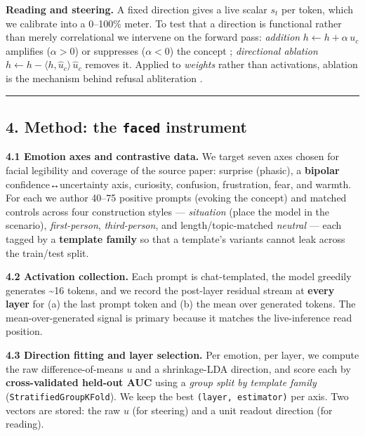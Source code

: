 \documentclass[
]{article}
\begin{document}
\textbf{Reading and steering.} A fixed direction gives a live scalar
\(s_t\) per token, which we calibrate into a 0--100\% meter. To test
that a direction is functional rather than merely correlational we
intervene on the forward pass: \emph{addition}
\(h \leftarrow h + \alpha\,u_c\) amplifies (\(\alpha>0\)) or suppresses
(\(\alpha<0\)) the concept \citep{turner2023actadd, rimsky2024caa};
\emph{directional ablation}
\(h \leftarrow h - \langle h,\hat u_c\rangle\,\hat u_c\) removes it.
Applied to \emph{weights} rather than activations, ablation is the
mechanism behind refusal abliteration \citep{arditi2024refusal}.

\begin{center}\rule{0.5\linewidth}{0.5pt}\end{center}

\subsection{\texorpdfstring{4. Method: the \texttt{faced}
instrument}{4. Method: the faced instrument}}\label{method-the-faced-instrument}

\textbf{4.1 Emotion axes and contrastive data.} We target seven axes
chosen for facial legibility and coverage of the source paper: surprise
(phasic), a \textbf{bipolar} confidence↔uncertainty axis, curiosity,
confusion, frustration, fear, and warmth. For each we author 40--75
positive prompts (evoking the concept) and matched controls across four
construction styles --- \emph{situation} (place the model in the
scenario), \emph{first-person}, \emph{third-person}, and
length/topic-matched \emph{neutral} --- each tagged by a
\textbf{template family} so that a template's variants cannot leak
across the train/test split.

\textbf{4.2 Activation collection.} Each prompt is chat-templated, the
model greedily generates \textasciitilde16 tokens, and we record the
post-layer residual stream at \textbf{every layer} for (a) the last
prompt token and (b) the mean over generated tokens. The
mean-over-generated signal is primary because it matches the
live-inference read position.

\textbf{4.3 Direction fitting and layer selection.} Per emotion, per
layer, we compute the raw difference-of-means \(u\) and a shrinkage-LDA
direction, and score each by \textbf{cross-validated held-out AUC} using
a \emph{group split by template family} (\texttt{StratifiedGroupKFold}).
We keep the best \texttt{(layer,\ estimator)} per axis. Two vectors are
stored: the raw \(u\) (for steering) and a unit readout direction (for
reading).
\end{document}
